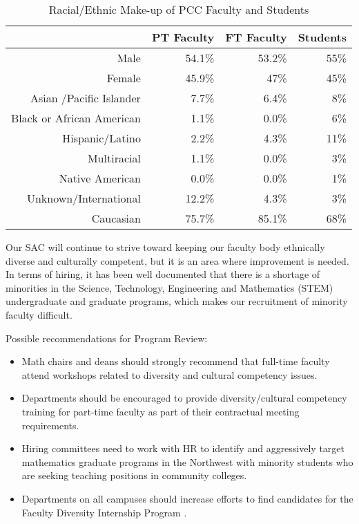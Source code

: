 \begin{table}[!htb]
  \centering
  \caption{Racial/Ethnic Make-up of PCC Faculty and Students}
  \label{reflect:tab:racialethnicmakeup}
  \begin{tabular}{rrrr}
    \toprule
            &PT Faculty &   FT Faculty  & Students\\
            \midrule
    Male    & 54.1\%    & 53.2\%     & 55\% \\
    Female  & 45.9\%    & 47\%       & 45\% \\
    Asian /Pacific Islander & 7.7\% &   6.4\%    & 8\%\\
    Black or African American &   1.1\%  &  0.0\% &   6\%\\
    Hispanic/Latino &  2.2\%   & 4.3\%  &  11\%\\
    Multiracial & 1.1\%  &  0.0\%  &  3\%\\
    Native American & 0.0\%  &  0.0\%  &  1\%\\
    Unknown/International   & 12.2\% &  4.3\% &    3\%\\
    Caucasian   & 75.7\%   & 85.1\%   & 68\%\\
    \bottomrule
  \end{tabular}
\end{table}

Our SAC will continue to strive toward keeping our faculty body ethnically
diverse and culturally competent, but it is an area where improvement is
needed. In terms of hiring, it has been well documented 
that there is a shortage of minorities in the Science, Technology, Engineering
and Mathematics (STEM) undergraduate and graduate programs, which makes our
recruitment of minority faculty difficult.

Possible recommendations for Program Review:
\begin{itemize}
  \item Math chairs and deans should strongly recommend that full-time faculty
    attend workshops related to diversity and cultural competency issues.
  \item Departments should be encouraged to provide diversity/cultural
  competency training for part-time faculty as part of their contractual
meeting requirements.\item Hiring committees need to work with HR to identify
  and aggressively target mathematics graduate programs in the Northwest with
  minority students who are seeking teaching positions in community colleges.
  \item Departments on all campuses should increase efforts to find candidates
    for the Faculty Diversity Internship Program \cite{affirmativeaction}.
\end{itemize}
